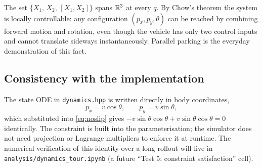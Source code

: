\begin{remark}
The set $\{X_1,\, X_2,\, [X_1, X_2]\}$ spans $\mathbb{R}^{3}$ at every $q$. By
Chow's theorem the system is locally controllable: any configuration
$(p_x, p_y, \theta)$ can be reached by combining forward motion and
rotation, even though the vehicle has only two control inputs and cannot
translate sideways instantaneously. Parallel parking is the everyday
demonstration of this fact.
\end{remark}

\subsection{Consistency with the implementation}
\label{subsec:constraint-consistency}

The state ODE in \texttt{dynamics.hpp} is written directly in body
coordinates,
\begin{equation}
    \dot p_x = v\cos\theta,
    \qquad
    \dot p_y = v\sin\theta,
\end{equation}
which substituted into \eqref{eq:noslip} gives
$-v\sin\theta\cos\theta + v\sin\theta\cos\theta = 0$ identically. The
constraint is built into the parameterisation; the simulator does not need
projection or Lagrange multipliers to enforce it at runtime. The numerical
verification of this identity over a long rollout will live in
\texttt{analysis/dynamics\_tour.ipynb} (a future ``Test 5: constraint
satisfaction'' cell).
